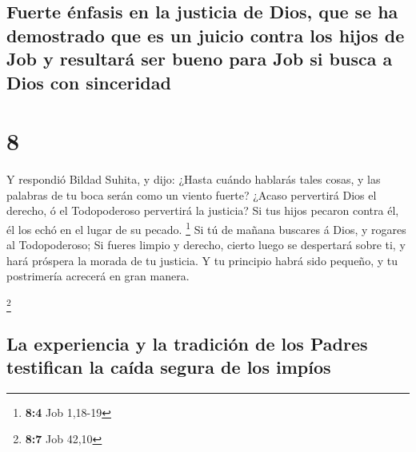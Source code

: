 \hypertarget{fuerte-uxe9nfasis-en-la-justicia-de-dios-que-se-ha-demostrado-que-es-un-juicio-contra-los-hijos-de-job-y-resultaruxe1-ser-bueno-para-job-si-busca-a-dios-con-sinceridad}{%
\subsection{Fuerte énfasis en la justicia de Dios, que se ha demostrado
que es un juicio contra los hijos de Job y resultará ser bueno para Job
si busca a Dios con
sinceridad}\label{fuerte-uxe9nfasis-en-la-justicia-de-dios-que-se-ha-demostrado-que-es-un-juicio-contra-los-hijos-de-job-y-resultaruxe1-ser-bueno-para-job-si-busca-a-dios-con-sinceridad}}

\hypertarget{section-7}{%
\section{8}\label{section-7}}

 Y respondió Bildad Suhita, y dijo:  ¿Hasta
cuándo hablarás tales cosas, y las palabras de tu boca serán como un
viento fuerte?  ¿Acaso pervertirá Dios el derecho, ó el
Todopoderoso pervertirá la justicia?  Si tus hijos pecaron
contra él, él los echó en el lugar de su pecado. \footnote{\textbf{8:4}
  Job 1,18-19}  Si tú de mañana buscares á Dios, y rogares
al Todopoderoso;  Si fueres limpio y derecho, cierto luego
se despertará sobre ti, y hará próspera la morada de tu justicia.
 Y tu principio habrá sido pequeño, y tu postrimería
acrecerá en gran manera.

\footnote{\textbf{8:7} Job 42,10}

\hypertarget{la-experiencia-y-la-tradiciuxf3n-de-los-padres-testifican-la-cauxedda-segura-de-los-impuxedos}{%
\subsection{La experiencia y la tradición de los Padres testifican la
caída segura de los
impíos}\label{la-experiencia-y-la-tradiciuxf3n-de-los-padres-testifican-la-cauxedda-segura-de-los-impuxedos}}

